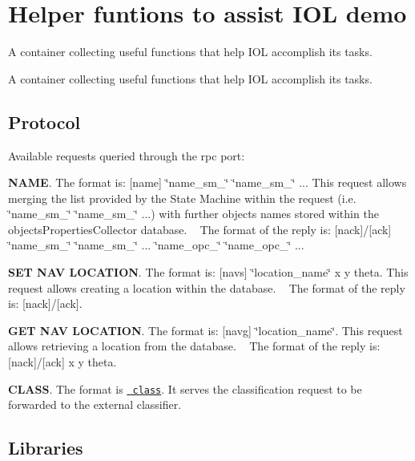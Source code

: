 \section{Helper funtions to assist I\+OL demo}
\label{group__icub__iolHelper}


A container collecting useful functions that help I\+OL accomplish its tasks.  


A container collecting useful functions that help I\+OL accomplish its tasks. 

\hypertarget{group__icub__iolHelper_proto_sec}{}\subsection{Protocol}\label{group__icub__iolHelper_proto_sec}
Available requests queried through the rpc port\+:
\begin{DoxyEnumerate}
\item {\bfseries{N\+A\+ME}}. The format is\+: \mbox{[}name\mbox{]} \char`\"{}name\+\_\+sm\+\_\char`\"{} \char`\"{}name\+\_\+sm\+\_\char`\"{} ... This request allows merging the list provided by the State Machine within the request (i.\+e. \char`\"{}name\+\_\+sm\+\_\char`\"{} \char`\"{}name\+\_\+sm\+\_\char`\"{} ...) with further objects names stored within the objects\+Properties\+Collector database. ~\newline
 The format of the reply is\+: \mbox{[}nack\mbox{]}/\mbox{[}ack\mbox{]} \char`\"{}name\+\_\+sm\+\_\char`\"{} \char`\"{}name\+\_\+sm\+\_\char`\"{} ... \char`\"{}name\+\_\+opc\+\_\char`\"{} \char`\"{}name\+\_\+opc\+\_\char`\"{} ...
\item {\bfseries{S\+ET N\+AV L\+O\+C\+A\+T\+I\+ON}}. The format is\+: \mbox{[}navs\mbox{]} \char`\"{}location\+\_\+name\char`\"{} x y theta. This request allows creating a location within the database. ~\newline
 The format of the reply is\+: \mbox{[}nack\mbox{]}/\mbox{[}ack\mbox{]}.
\item {\bfseries{G\+ET N\+AV L\+O\+C\+A\+T\+I\+ON}}. The format is\+: \mbox{[}navg\mbox{]} \char`\"{}location\+\_\+name\char`\"{}. This request allows retrieving a location from the database. ~\newline
 The format of the reply is\+: \mbox{[}nack\mbox{]}/\mbox{[}ack\mbox{]} x y theta.
\item {\bfseries{C\+L\+A\+SS}}. The format is \href{(blob_0 (tlx tly brx 
   bry)) (blob_1 (tlx tly brx bry)) ...}{\texttt{ class}}. It serves the classification request to be forwarded to the external classifier.
\end{DoxyEnumerate}\hypertarget{group__icub__iolStateMachineHandler_lib_sec}{}\subsection{Libraries}\label{group__icub__iolStateMachineHandler_lib_sec}

